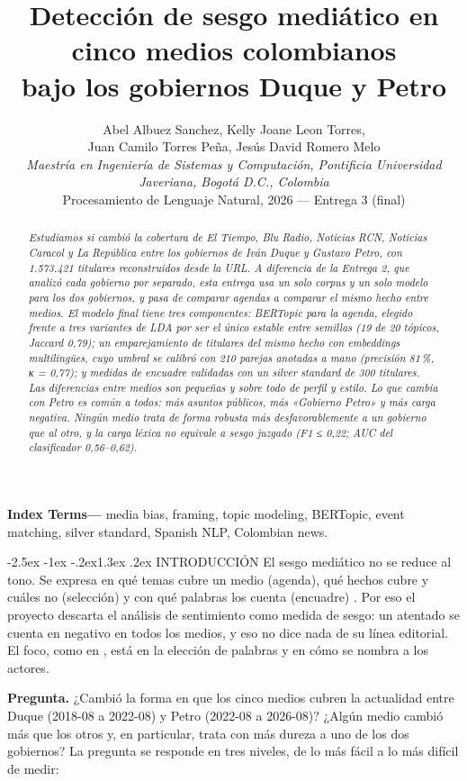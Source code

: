 \documentclass[10pt,twocolumn]{article}
\title{\textbf{Detección de sesgo mediático en cinco medios colombianos\\bajo los gobiernos Duque y Petro}}
\author{Abel Albuez Sanchez, Kelly Joane Leon Torres,\\Juan Camilo Torres Peña, Jesús David Romero Melo\\
\small\textit{Maestría en Ingeniería de Sistemas y Computación, Pontificia Universidad Javeriana, Bogotá D.C., Colombia}\\
\small Procesamiento de Lenguaje Natural, 2026 --- Entrega 3 (final)}
\date{}
\makeatletter
\renewcommand{\section}{\@startsection{section}{1}{\z@}%
  {-2.5ex \@plus -1ex \@minus -.2ex}{1.3ex \@plus .2ex}%
  {\normalfont\large\bfseries\centering}}
\makeatother
\begin{document}
\maketitle

\begin{abstract}
\textit{Estudiamos si cambió la cobertura de El Tiempo, Blu Radio, Noticias RCN,
Noticias Caracol y La República entre los gobiernos de Iván Duque y Gustavo Petro,
con 1.573.421 titulares reconstruidos desde la URL. A diferencia de la Entrega 2,
que analizó cada gobierno por separado, esta entrega usa un solo corpus y un solo
modelo para los dos gobiernos, y pasa de comparar agendas a comparar el mismo
hecho entre medios. El modelo final tiene tres componentes: BERTopic para la
agenda, elegido frente a tres variantes de LDA por ser el único estable entre
semillas (19 de 20 tópicos, Jaccard 0,79); un emparejamiento de titulares del
mismo hecho con embeddings multilingües, cuyo umbral se calibró con 210 parejas
anotadas a mano (precisión 81\,\%, κ = 0,77); y medidas de encuadre validadas
con un silver standard de 300 titulares. Las diferencias entre medios son
pequeñas y sobre todo de perfil y estilo. Lo que cambia con Petro es común a
todos: más asuntos públicos, más «Gobierno Petro» y más carga negativa. Ningún
medio trata de forma robusta más desfavorablemente a un gobierno que al otro, y
la carga léxica no equivale a sesgo juzgado (F1 ≤ 0,22; AUC del clasificador
0,56--0,62).}
\end{abstract}

\noindent\textbf{Index Terms---} media bias, framing, topic modeling, BERTopic,
event matching, silver standard, Spanish NLP, Colombian news.

\section{INTRODUCCIÓN}
El sesgo mediático no se reduce al tono. Se expresa en qué temas cubre un medio
(agenda), qué hechos cubre y cuáles no (selección) y con qué palabras los cuenta
(encuadre) \cite{entman,hamborg2019}. Por eso el proyecto descarta el análisis
de sentimiento como medida de sesgo: un atentado se cuenta en negativo en todos
los medios, y eso no dice nada de su línea editorial. El foco, como en
\cite{hamborg2020}, está en la elección de palabras y en cómo se nombra a los
actores.

\textbf{Pregunta.} ¿Cambió la forma en que los cinco medios cubren la actualidad
entre Duque (2018-08 a 2022-08) y Petro (2022-08 a 2026-08)? ¿Algún medio cambió
más que los otros y, en particular, trata con más dureza a uno de los dos
gobiernos? La pregunta se responde en tres niveles, de lo más fácil a lo más
difícil de medir:
\end{document}
